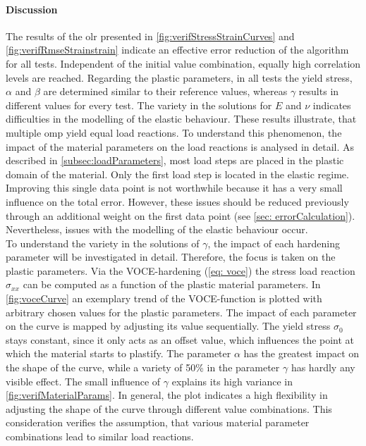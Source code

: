 \paragraph{Discussion}
The results of the \acrlong{olr} presented in \autoref{fig:verifStressStrainCurves} and \autoref{fig:verifRmseStrainstrain} indicate an effective error reduction of the algorithm for all tests. Independent of the initial value combination, equally high correlation levels are reached. Regarding the plastic parameters, in all tests the yield stress, $\alpha$ and $\beta$ are determined similar to their reference values, whereas $\gamma$ results in different values for every test.  
The variety in the solutions for $E$ and $\nu$ indicates difficulties in the modelling of the elastic behaviour. 
These results illustrate, that multiple \acrlong{omp} yield equal load reactions. To understand this phenomenon, the impact of the material parameters on the load reactions is analysed in detail.
As described in \autoref{subsec:loadParameters}, most load steps are placed in the plastic domain of the material.
Only the first load step is located in the elastic regime.
Improving this single data point is not worthwhile because it has a very small influence on the total error.
However, these issues should be reduced previously through an additional weight on the first data point (see \autoref{sec: errorCalculation}).
Nevertheless, issues with the modelling of the elastic behaviour occur. \\
\indent To understand the variety in the solutions of $\gamma$, the impact of each hardening parameter will be investigated in detail.
Therefore, the focus is taken on the plastic parameters. Via the VOCE-hardening (\autoref{eq: voce}) the stress load reaction $\sigma_{xx}$ can be computed as a function of the plastic material parameters.
In \autoref{fig:voceCurve} an exemplary trend of the VOCE-function is plotted with arbitrary chosen values for the plastic parameters. The impact of each parameter on the curve is mapped by adjusting its value sequentially. The yield stress $\sigma_0$ stays constant, since it only acts as an offset value, which influences the point at which the material starts to plastify. The parameter $\alpha$ has the greatest impact on the shape of the curve, while a variety of 50\% in the parameter $\gamma$ has hardly any visible effect. The small influence of $\gamma$ explains its high variance in \autoref{fig:verifMaterialParams}. In general, the plot indicates a high flexibility in adjusting the shape of the curve through different value combinations. This consideration verifies the assumption, that various material parameter combinations lead to similar load reactions.

